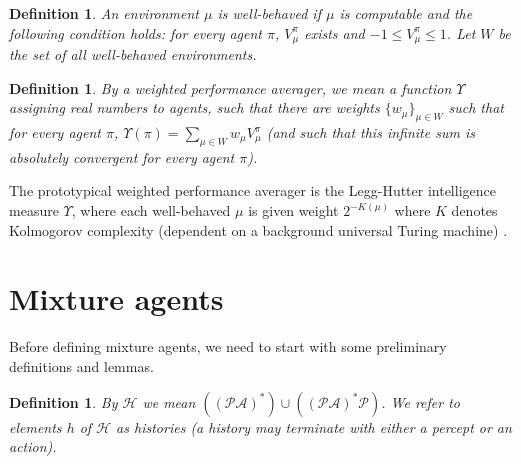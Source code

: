 \documentclass{article}
\newtheorem{definition}[theorem]{Definition}
\begin{document}
\begin{definition}
    An environment $\mu$ is \emph{well-behaved} if $\mu$ is computable and the following
    condition holds: for every agent $\pi$, $V^\pi_\mu$ exists and
    $-1\leq V^\pi_\mu\leq 1$. Let $W$ be the set of all well-behaved environments.
\end{definition}

\begin{definition}
\label{performanceaveragerdefn}
    By a \emph{weighted performance averager}, we mean a function
    $\Upsilon$ assigning real numbers to agents, such that there
    are weights $\{w_\mu\}_{\mu\in W}$ such that for every agent
    $\pi$, $\Upsilon(\pi)=\sum_{\mu\in W}w_\mu V^\pi_\mu$
    (and such that this infinite sum is absolutely convergent
    for every agent $\pi$).
\end{definition}

The prototypical weighted performance averager is the Legg-Hutter intelligence
measure $\Upsilon$, where each well-behaved $\mu$ is given weight $2^{-K(\mu)}$
where $K$ denotes Kolmogorov complexity (dependent on a background universal
Turing machine) \cite{legg2007universal}.

\section{Mixture agents}

Before defining mixture agents, we need to start with some preliminary definitions
and lemmas.

\begin{definition}
    By $\mathcal H$ we mean
    $((\mathcal P\mathcal A)^*)\cup((\mathcal P\mathcal A)^*\mathcal P)$.
    We refer to elements $h$ of $\mathcal H$ as \emph{histories} (a history
    may terminate with either a percept or an action).
\end{definition}
\end{document}
